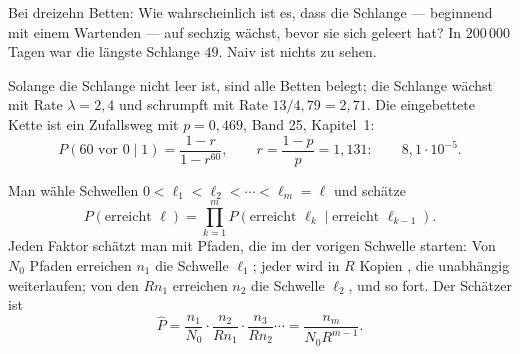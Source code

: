 \begin{merksatz}
Bei dreizehn Betten: Wie wahrscheinlich ist es, dass die Schlange --- beginnend mit einem Wartenden --- auf sechzig wächst, bevor sie sich geleert hat? In $200\,000$ Tagen war die längste Schlange $49$. Naiv ist nichts zu sehen.

Solange die Schlange nicht leer ist, sind alle Betten belegt; die Schlange wächst mit Rate $\lambda = 2{,}4$ und schrumpft mit Rate $13/4{,}79 = 2{,}71$. Die eingebettete Kette ist ein Zufallsweg mit $p = 0{,}469$, Band 25, Kapitel~1:
\[ P(\text{60 vor 0}\mid 1) = \frac{1-r}{1-r^{60}}, \qquad r = \frac{1-p}{p} = 1{,}131: \qquad 8{,}1\cdot10^{-5} . \]

\begin{center}
\begin{minipage}{0.88\textwidth}
\end{minipage}
\end{center}
\end{merksatz}

\begin{definition}
Man wähle Schwellen $0 < \ell_1 < \ell_2 < \cdots < \ell_m = \ell$ und schätze
\[ P(\text{erreicht } \ell) = \prod_{k=1}^{m} P(\text{erreicht } \ell_k \mid \text{erreicht } \ell_{k-1}) . \]
Jeden Faktor schätzt man mit Pfaden, die im  der vorigen Schwelle starten: Von $N_0$ Pfaden erreichen $n_1$ die Schwelle $\ell_1$; jeder wird in $R$ Kopien , die unabhängig weiterlaufen; von den $Rn_1$ erreichen $n_2$ die Schwelle $\ell_2$, und so fort. Der Schätzer ist
\[ \hat P = \frac{n_1}{N_0}\cdot\frac{n_2}{Rn_1}\cdot\frac{n_3}{Rn_2}\cdots = \frac{n_m}{N_0 R^{m-1}} . \]
\end{definition}

